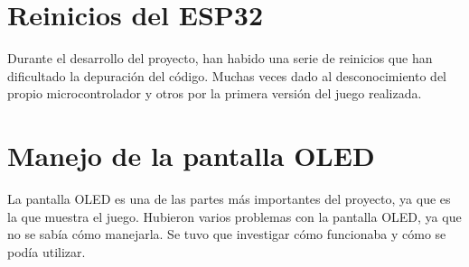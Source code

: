 \section{Reinicios del ESP32}

Durante el desarrollo del proyecto, han habido una serie de reinicios que han dificultado la depuración del código. Muchas veces dado al desconocimiento del propio microcontrolador y otros por la primera versión del juego realizada.

\section{Manejo de la pantalla OLED}

La pantalla OLED es una de las partes más importantes del proyecto, ya que es la que muestra el juego. Hubieron varios problemas con la pantalla OLED, ya que no se sabía cómo manejarla. Se tuvo que investigar cómo funcionaba y cómo se podía utilizar.

